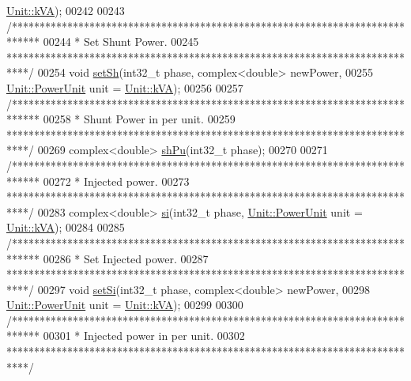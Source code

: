 \begin{DoxyCode}
      \hyperlink{class_unit_ace265ae255370ccacfd5370337572c3ba72b181a842ae2759488a2fa1410d3696}{Unit::kVA});
00242 
00243   \textcolor{comment}{/*****************************************************************************}
00244 \textcolor{comment}{   * Set Shunt Power.}
00245 \textcolor{comment}{   ****************************************************************************/}
00254   \textcolor{keywordtype}{void} \hyperlink{group___models_ga207abd3d0649a488e3c44cf2a501ed23}{setSh}(int32\_t phase, complex<double> newPower,
00255              \hyperlink{class_unit_ace265ae255370ccacfd5370337572c3b}{Unit::PowerUnit} unit = \hyperlink{class_unit_ace265ae255370ccacfd5370337572c3ba72b181a842ae2759488a2fa1410d3696}{Unit::kVA});
00256 
00257   \textcolor{comment}{/*****************************************************************************}
00258 \textcolor{comment}{   * Shunt Power in per unit.}
00259 \textcolor{comment}{   ****************************************************************************/}
00269   complex<double> \hyperlink{group___models_ga7df2ed5705f06c0cf2937d25102ca847}{shPu}(int32\_t phase);
00270 
00271   \textcolor{comment}{/*****************************************************************************}
00272 \textcolor{comment}{   * Injected power.}
00273 \textcolor{comment}{   ****************************************************************************/}
00283   complex<double> \hyperlink{group___models_ga02bbc279f1e133f66b12ee21e7bebcd8}{si}(int32\_t phase, \hyperlink{class_unit_ace265ae255370ccacfd5370337572c3b}{Unit::PowerUnit} unit = 
      \hyperlink{class_unit_ace265ae255370ccacfd5370337572c3ba72b181a842ae2759488a2fa1410d3696}{Unit::kVA});
00284 
00285   \textcolor{comment}{/*****************************************************************************}
00286 \textcolor{comment}{   * Set Injected power.}
00287 \textcolor{comment}{   ****************************************************************************/}
00297   \textcolor{keywordtype}{void} \hyperlink{group___models_ga74e510be49e50e4c14550b32e1dc92f9}{setSi}(int32\_t phase, complex<double> newPower,
00298              \hyperlink{class_unit_ace265ae255370ccacfd5370337572c3b}{Unit::PowerUnit} unit = \hyperlink{class_unit_ace265ae255370ccacfd5370337572c3ba72b181a842ae2759488a2fa1410d3696}{Unit::kVA});
00299 
00300   \textcolor{comment}{/*****************************************************************************}
00301 \textcolor{comment}{   * Injected power in per unit.}
00302 \textcolor{comment}{   ****************************************************************************/}

\end{DoxyCode}

